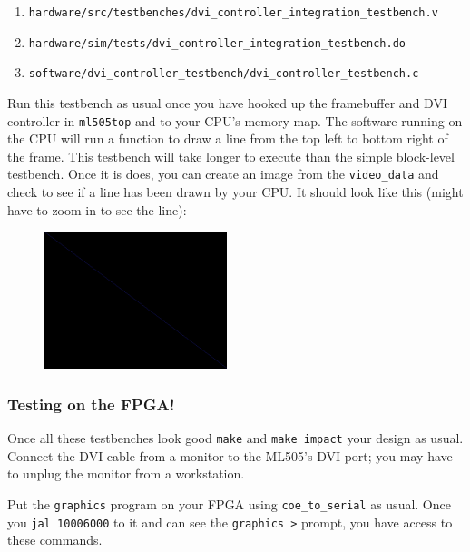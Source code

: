 \documentclass[11pt]{article}
\begin{document}
\begin{enumerate}
	\item \verb|hardware/src/testbenches/dvi_controller_integration_testbench.v|
	\item \verb|hardware/sim/tests/dvi_controller_integration_testbench.do|
	\item \verb|software/dvi_controller_testbench/dvi_controller_testbench.c|
\end{enumerate}

Run this testbench as usual once you have hooked up the framebuffer and DVI controller in \verb|ml505top| and to your CPU's memory map. The software running on the CPU will run a function to draw a line from the top left to bottom right of the frame. This testbench will take longer to execute than the simple block-level testbench. Once it is does, you can create an image from the \verb|video_data| and check to see if a line has been drawn by your CPU. It should look like this (might have to zoom in to see the line):

\begin{figure}[H]
	\centerline{\includegraphics[height=4cm]{dvi_controller_integration_testbench_output.png}}
\end{figure}

\subsubsection{Testing on the FPGA!}

Once all these testbenches look good \verb|make| and \verb|make impact| your design as usual. Connect the DVI cable from a monitor to the ML505's DVI port; you may have to unplug the monitor from a workstation.

Put the \verb|graphics| program on your FPGA using \verb|coe_to_serial| as usual. Once you \verb|jal 10006000| to it and can see the \verb|graphics >| prompt, you have access to these commands.
\end{document}

